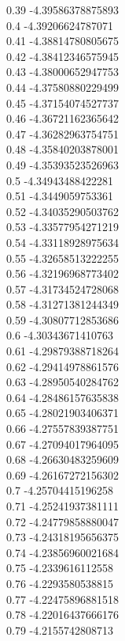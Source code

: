 {0.39	-4.39586378875893\\
0.4	-4.39206624787071\\
0.41	-4.38814780805675\\
0.42	-4.38412346575945\\
0.43	-4.38000652947753\\
0.44	-4.37580880229499\\
0.45	-4.37154074527737\\
0.46	-4.36721162365642\\
0.47	-4.36282963754751\\
0.48	-4.35840203878001\\
0.49	-4.35393523526963\\
0.5	-4.34943488422281\\
0.51	-4.3449059753361\\
0.52	-4.34035290503762\\
0.53	-4.33577954271219\\
0.54	-4.33118928975634\\
0.55	-4.32658513222255\\
0.56	-4.32196968773402\\
0.57	-4.31734524728068\\
0.58	-4.31271381244349\\
0.59	-4.30807712853686\\
0.6	-4.30343671410763\\
0.61	-4.29879388718264\\
0.62	-4.29414978861576\\
0.63	-4.28950540284762\\
0.64	-4.28486157635838\\
0.65	-4.28021903406371\\
0.66	-4.27557839387751\\
0.67	-4.27094017964095\\
0.68	-4.26630483259609\\
0.69	-4.26167272156302\\
0.7	-4.25704415196258\\
0.71	-4.25241937381111\\
0.72	-4.24779858880047\\
0.73	-4.24318195656375\\
0.74	-4.23856960021684\\
0.75	-4.2339616112558\\
0.76	-4.2293580538815\\
0.77	-4.22475896881518\\
0.78	-4.22016437666176\\
0.79	-4.2155742808713\\
}
